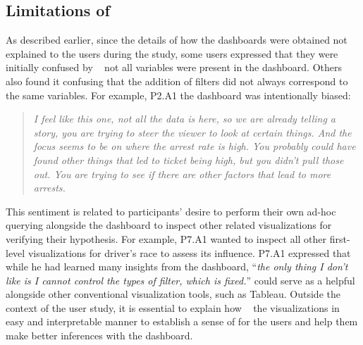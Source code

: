 \subsection{Limitations of \system}
\par As described earlier, since the details of how the dashboards were obtained  not explained to the users during the study, some users expressed that they were initially confused by \system\  not all variables were present in the dashboard. Others also found it confusing that the addition of filters did not always correspond to the same variables. For example, P2.A1  the dashboard was intentionally biased:
\begin{quote}
\textit{I feel like this one, not all the data is here, so we are already telling a story, you are trying to steer the viewer to look at certain things. And the focus seems to be on where the arrest rate is high. You probably could have found other things that led to ticket being high, but you didn't pull those out. You are trying to see if there are other factors that lead to more arrests.}
\end{quote}
\npar This sentiment is related to participants' desire to perform their own ad-hoc querying alongside the dashboard to inspect other related visualizations for verifying their hypothesis. For example, P7.A1 wanted to inspect all other first-level visualizations for driver's race to assess its influence. P7.A1 expressed that while he had learned many insights from the dashboard, ``\textit{the only thing I don't like is I cannot control the types of filter, which is fixed.}''
 \system could serve as a helpful  alongside other conventional visualization tools, such as Tableau. Outside the context of the user study, it is essential to explain how \system\  the visualizations in  easy and interpretable manner to establish a sense of  for the users and
help them make better inferences with the dashboard.

